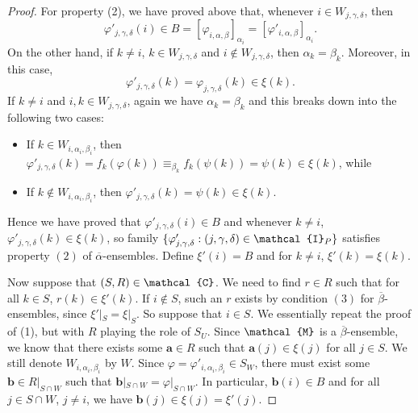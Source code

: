 \documentclass[11pt]{amsart}
\newcommand{\vr}[1]{{\uppercase {\mathcal{#1}}}}
\theoremstyle{definition}
\begin{document}
\begin{proof}
For property (2), we have proved above that, whenever $i\in W_{j,\gamma,\delta}$, then $$\varphi'_{j,\gamma,\delta}(i)\in B=[\varphi_{i,\alpha,\beta}]_{\alpha_i}=[\varphi'_{i,\alpha,\beta}]_{\alpha_i}.$$ 
On the other hand, if $k\neq i$, $k\in W_{j,\gamma,\delta}$ and $i\notin W_{j,\gamma,\delta}$, then $\alpha_k=\beta_k$. Moreover, in this case, 
$$\varphi'_{j,\gamma,\delta}(k)=\varphi_{j,\gamma,\delta}(k)\in\xi(k).$$
If $k\neq i$ and $i,k\in W_{j,\gamma,\delta}$, again we have $\alpha_k=\beta_k$ and this breaks down into the following two cases:
\begin{itemize}
\item If $k\in W_{i,\alpha_i,\beta_i}$, then $\varphi'_{j,\gamma,\delta}(k)=f_k(\varphi(k))\equiv_{\beta_k} f_k(\psi(k))=\psi(k)\in \xi(k)$, while
\item If $k\notin W_{i,\alpha_i,\beta_i}$, then $\varphi'_{j,\gamma,\delta}(k)=\psi(k)\in \xi(k)$.
\end{itemize}
Hence we have proved that $\varphi'_{j,\gamma,\delta}(i)\in B$ and whenever $k\neq i$, $\varphi'_{j,\gamma,\delta}(k)\in \xi(k)$, so family $\{\varphi'_{j,\gamma,\delta}:(j,\gamma,\delta)\in \vr i_P\}$ satisfies property $(2)$ of $\overline{\alpha}$-ensembles. Define $\xi'(i)=B$ and for $k\neq i$, $\xi'(k)=\xi(k)$.

Now suppose that $(S,R)\in\vr c$. We need to find $r\in R$ such that for all $k\in S$, $r(k)\in \xi'(k)$. If $i\notin S$, such an $r$ exists by condition $(3)$ for $\overline{\beta}$-ensembles, since $\xi'|_S=\xi|_S$. So suppose that $i\in S$. We essentially repeat the proof of (1), but with $R$ playing the role of $S_U$. Since $\vr m$ is a $\overline{\beta}$-ensemble, we know that there exists some $\mathbf{a}\in R$ such that $\mathbf{a}(j)\in\xi(j)$ for all $j\in S$. We still denote $W_{i,\alpha_i,\beta_i}$ by $W$. Since $\varphi=\varphi'_{i,\alpha_i,\beta_i}\in 
S_W$, there must exist some $\mathbf{b}\in R|_{S\cap W}$ such that $\mathbf{b}|_{S\cap W}=\varphi|_{S\cap W}$. In particular, $\mathbf{b}(i)\in B$ and for all $j\in S\cap W$, $j\neq i$, we have $\mathbf{b}(j)\in \xi(j)=\xi'(j)$.


\end{proof}
\end{document}
